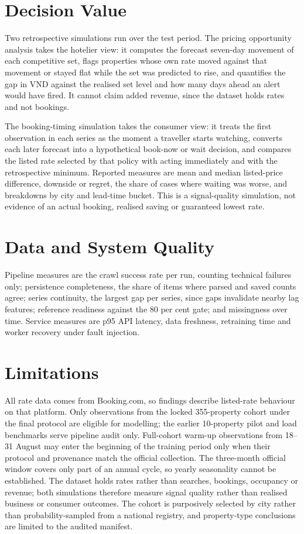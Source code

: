 \section{Decision Value}

Two retrospective simulations run over the test period. The pricing opportunity analysis takes the hotelier view: it computes the forecast seven-day movement of each competitive set, flags properties whose own rate moved against that movement or stayed flat while the set was predicted to rise, and quantifies the gap in VND against the realised set level and how many days ahead an alert would have fired. It cannot claim added revenue, since the dataset holds rates and not bookings.

The booking-timing simulation takes the consumer view: it treats the first observation in each series as the moment a traveller starts watching, converts each later forecast into a hypothetical book-now or wait decision, and compares the listed rate selected by that policy with acting immediately and with the retrospective minimum. Reported measures are mean and median listed-price difference, downside or regret, the share of cases where waiting was worse, and breakdowns by city and lead-time bucket. This is a signal-quality simulation, not evidence of an actual booking, realised saving or guaranteed lowest rate.

\section{Data and System Quality}

Pipeline measures are the crawl success rate per run, counting technical failures only; persistence completeness, the share of items where parsed and saved counts agree; series continuity, the largest gap per series, since gaps invalidate nearby lag features; reference readiness against the 80 per cent gate; and missingness over time. Service measures are p95 API latency, data freshness, retraining time and worker recovery under fault injection.

\section{Limitations}

All rate data comes from Booking.com, so findings describe listed-rate behaviour on that platform. Only observations from the locked 355-property cohort under the final protocol are eligible for modelling; the earlier 10-property pilot and load benchmarks serve pipeline audit only. Full-cohort warm-up observations from 18--31 August may enter the beginning of the training period only when their protocol and provenance match the official collection. The three-month official window covers only part of an annual cycle, so yearly seasonality cannot be established. The dataset holds rates rather than searches, bookings, occupancy or revenue; both simulations therefore measure signal quality rather than realised business or consumer outcomes. The cohort is purposively selected by city rather than probability-sampled from a national registry, and property-type conclusions are limited to the audited manifest.

\clearpage
